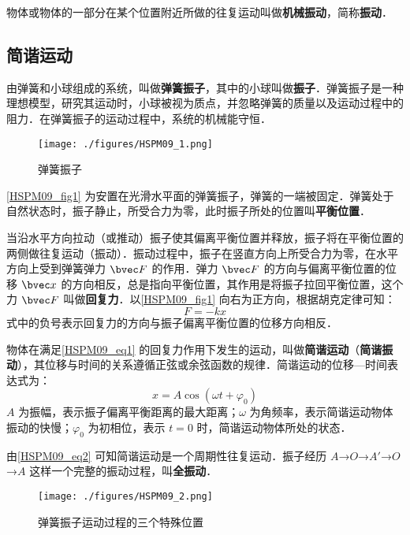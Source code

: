 

物体或物体的一部分在某个位置附近所做的往复运动叫做\textbf{机械振动}，简称\textbf{振动}．

\subsection{简谐运动}

由弹簧和小球组成的系统，叫做\textbf{弹簧振子}，其中的小球叫做\textbf{振子}．弹簧振子是一种理想模型，研究其运动时，小球被视为质点，并忽略弹簧的质量以及运动过程中的阻力．在弹簧振子的运动过程中，系统的机械能守恒．

\begin{figure}[ht]
\centering
\texttt{[image: ./figures/HSPM09\_1.png]}
\caption{弹簧振子} \label{HSPM09_fig1}
\end{figure}

\autoref{HSPM09_fig1} 为安置在光滑水平面的弹簧振子，弹簧的一端被固定．弹簧处于自然状态时，振子静止，所受合力为零，此时振子所处的位置叫\textbf{平衡位置}．

当沿水平方向拉动（或推动）振子使其偏离平衡位置并释放，振子将在平衡位置的两侧做往复运动（振动）．振动过程中，振子在竖直方向上所受合力为零，在水平方向上受到弹簧弹力 $\bvec F$ 的作用．弹力 $\bvec F$ 的方向与偏离平衡位置的位移 $\bvec x$ 的方向相反，总是指向平衡位置，其作用是将振子拉回平衡位置，这个力 $\bvec F$ 叫做\textbf{回复力}．以\autoref{HSPM09_fig1} 向右为正方向，根据胡克定律可知：
\begin{equation}\label{HSPM09_eq1}
F=-kx
\end{equation}
式中的负号表示回复力的方向与振子偏离平衡位置的位移方向相反．

物体在满足\autoref{HSPM09_eq1} 的回复力作用下发生的运动，叫做\textbf{简谐运动}（\textbf{简谐振动}），其位移与时间的关系遵循正弦或余弦函数的规律．简谐运动的位移—时间表达式为：
\begin{equation}\label{HSPM09_eq2}
x=A\cos(\omega t + \varphi_0)
\end{equation}
$A$ 为振幅，表示振子偏离平衡距离的最大距离；$\omega$ 为角频率，表示简谐运动物体振动的快慢；$\varphi_0$ 为初相位，表示 $t=0$ 时，简谐运动物体所处的状态．

由\autoref{HSPM09_eq2} 可知简谐运动是一个周期性往复运动．振子经历 $A$→$O$→$A'$→$O$→$A$ 这样一个完整的振动过程，叫\textbf{全振动}．

\begin{figure}[ht]
\centering
\texttt{[image: ./figures/HSPM09\_2.png]}
\caption{弹簧振子运动过程的三个特殊位置} \label{HSPM09_fig2}
\end{figure}

